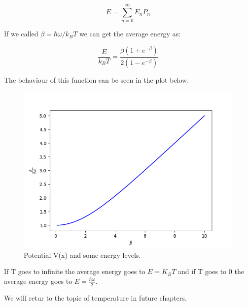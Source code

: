 \begin{equation}
  E = \sum_{n=0}^{\infty}E_nP_n
\end{equation}

If we called $\beta = \hbar\omega/k_B T$ we can get the average energy as:

\begin{equation}
  \frac{E}{k_B T} = \frac{\beta(1+e^{-\beta})}{2(1-e^{-\beta})}
\end{equation}

The behaviour of this function can be seen in the plot below.


\begin{figure}[H]
  \centering
  \includegraphics{images7/E_beta.png}
  \caption{Potential V(x) and some energy levels.}
\end{figure}

If T goes to infinite the average energy goes to $E=K_BT$ and if T goes to 0 the average energy goes to $E=\frac{\hbar\omega}{2}$.

We will retur to the topic of temperature in future chapters.
